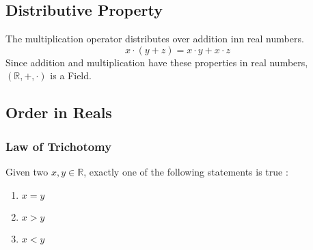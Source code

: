 \documentclass{scrartcl}
\newcommand{\rn}{\mathbb{R}}
\begin{document}
    \subsection{Distributive Property}
    The multiplication operator distributes over addition inn real numbers.
    $$x \cdot (y + z) = x \cdot y + x \cdot z$$
    Since addition and multiplication have these properties in real numbers, $(\rn, +, \cdot)$ is a Field.
    \subsection{Order in Reals}
    \subsubsection{Law of Trichotomy}
    Given two $x, y \in \rn$, exactly one of the following statements is true :
    \begin{enumerate}[label={(\roman*)}]
        \item $x = y$
        \item $x > y$
        \item $x < y$
    \end{enumerate}
\end{document}
